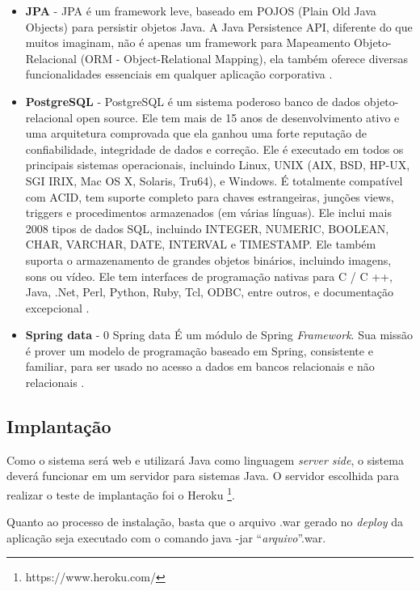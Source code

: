 \documentclass[a4paper,12pt]{monografia}
\begin{document}
\begin{itemize}
\item \textbf{JPA} - JPA é um framework leve, baseado em POJOS (Plain Old Java Objects) para persistir objetos Java. A Java Persistence API, diferente do que muitos imaginam, não é apenas um framework para Mapeamento Objeto-Relacional (ORM - Object-Relational Mapping), ela também oferece diversas funcionalidades essenciais em qualquer aplicação corporativa \cite{medeiros}.

\item \textbf{PostgreSQL} - PostgreSQL é um sistema poderoso banco de dados objeto-relacional open source. Ele tem mais de 15 anos de desenvolvimento ativo e uma arquitetura comprovada que ela ganhou uma forte reputação de confiabilidade, integridade de dados e correção. Ele é executado em todos os principais sistemas operacionais, incluindo Linux, UNIX (AIX, BSD, HP-UX, SGI IRIX, Mac OS X, Solaris, Tru64), e Windows. É totalmente compatível com ACID, tem suporte completo para chaves estrangeiras, junções views, triggers e procedimentos armazenados (em várias línguas). Ele inclui mais 2008 tipos de dados SQL, incluindo INTEGER, NUMERIC, BOOLEAN, CHAR, VARCHAR, DATE, INTERVAL e TIMESTAMP. Ele também suporta o armazenamento de grandes objetos binários, incluindo imagens, sons ou vídeo. Ele tem interfaces de programação nativas para C / C ++, Java, .Net, Perl, Python, Ruby, Tcl, ODBC, entre outros, e documentação excepcional \cite{postgresql}.

\item \textbf{Spring data} - 0 Spring data É um módulo de Spring \textit{Framework}. Sua missão é prover um modelo de programação baseado em Spring, consistente e familiar, para ser usado no acesso a dados em bancos relacionais e não relacionais \cite{springdata}.

\end{itemize}


\subsection{Implantação} %
\label{sub:o_que_deve_ser_produzido}

Como o sistema será web e utilizará Java como linguagem \textit{server side}, o sistema deverá funcionar em um servidor para sistemas  Java. O servidor escolhida para realizar o teste de implantação foi o Heroku \footnote{https://www.heroku.com/}.

Quanto ao processo de instalação, basta que o arquivo .war gerado no \textit{deploy} da aplicação seja executado com o comando java -jar ``\textit{arquivo}''.war.
\end{document}

